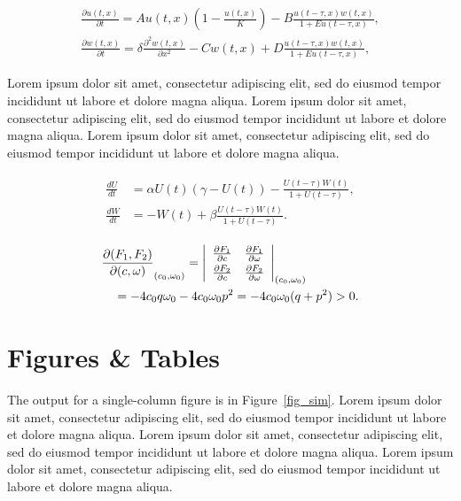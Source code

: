 \documentclass[
  journal=small,
  manuscript=article-type,  %
  year=2020,
  volume=37,
]{cup-journal}
\begin{document}
\begin{equation}
\begin{aligned}\label{eq:first}
\frac{\partial u(t,x)}{\partial t} = Au(t,x) \left(1-\frac{u(t,x)}{K}\right)
 -B\frac{u(t-\tau,x) w(t,x)}{1+Eu(t-\tau,x)},\\
\frac{\partial w(t,x)}{\partial t} =\delta \frac{\partial^2w(t,x)}{\partial x^2}-Cw(t,x)
+D\frac{u(t-\tau,x)w(t,x)}{1+Eu(t-\tau,x)},
\end{aligned}
\end{equation}

 Lorem ipsum dolor sit amet, consectetur adipiscing elit, sed do eiusmod tempor incididunt ut labore et dolore magna aliqua. Lorem ipsum dolor sit amet, consectetur adipiscing elit, sed do eiusmod tempor incididunt ut labore et dolore magna aliqua. Lorem ipsum dolor sit amet, consectetur adipiscing elit, sed do eiusmod tempor incididunt ut labore et dolore magna aliqua. 

\begin{align}\label{eq:another}
\begin{split}
\frac{dU}{dt} &=\alpha U(t)(\gamma -U(t))-\frac{U(t-\tau)W(t)}{1+U(t-\tau)},\\
\frac{dW}{dt} &=-W(t)+\beta\frac{U(t-\tau)W(t)}{1+U(t-\tau)}.
\end{split}
\end{align}


\begin{align*}
&\frac{\partial(F_1,F_2)}{\partial(c,\omega)}_{(c_0,\omega_0)} = \left|
\begin{array}{ll}
\frac{\partial F_1}{\partial c} &\frac{\partial F_1}{\partial \omega} \\\noalign{\vskip3pt}
\frac{\partial F_2}{\partial c}&\frac{\partial F_2}{\partial \omega}
\end{array}\right|_{(c_0,\omega_0)}\\
&\quad=-4c_0q\omega_0 -4c_0\omega_0p^2 =-4c_0\omega_0(q+p^2)>0.
\end{align*}


\section{Figures \& Tables}

The output for a single-column figure is in Figure~\ref{fig_sim}.  Lorem ipsum dolor sit amet, consectetur adipiscing elit, sed do eiusmod tempor incididunt ut labore et dolore magna aliqua. Lorem ipsum dolor sit amet, consectetur adipiscing elit, sed do eiusmod tempor incididunt ut labore et dolore magna aliqua. Lorem ipsum dolor sit amet, consectetur adipiscing elit, sed do eiusmod tempor incididunt ut labore et dolore magna aliqua. 
\end{document}
